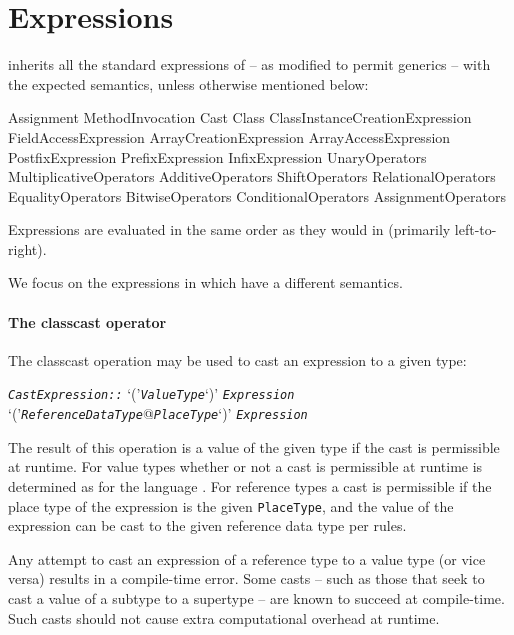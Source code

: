 \section{Expressions}\label{XtenExpressions}

{}\Xten{} inherits all the standard expressions of \Java{}
\cite[\S~15]{jls2} -- as modified to permit generics \cite{gjspec} --
with the expected semantics, unless otherwise mentioned below:

\begin{x10}
Assignment MethodInvocation 
Cast Class
ClassInstanceCreationExpression FieldAccessExpression   
ArrayCreationExpression ArrayAccessExpression
PostfixExpression PrefixExpression 
InfixExpression UnaryOperators
MultiplicativeOperators AdditiveOperators 
ShiftOperators RelationalOperators  
EqualityOperators BitwiseOperators
ConditionalOperators AssignmentOperators
\end{x10}

Expressions are evaluated in the same order as they would in \java{}
(primarily
left-to-right).\label{FieldAccess}\label{ClassCreation}\label{MethodInvocation}

We focus on the expressions in \Xten{} which have a different
semantics.

\paragraph{The classcast operator}\label{ClassCast}

The classcast operation may be used to cast an expression to a given type:

\begin{x10}
 {\em\tt{}CastExpression::}
   `('{\em\tt{}ValueType}`)' {\em\tt{}Expression}
   `('{\em\tt{}ReferenceDataType}@{\em\tt{}PlaceType}`)' {\em\tt{}Expression}
\end{x10}

The result of this operation is a value of the given type if the cast
is permissible at runtime. For value types whether or not a cast is
permissible at runtime is determined as for the \java{} language
{}\cite[\S 5.5]{jls2}. For reference types a cast is permissible if
the place type of the expression is the given {\tt PlaceType}, and the
value of the expression can be cast to the given reference data type
per \java{} rules.

Any attempt to cast an expression of a reference type to a value type
(or vice versa) results in a compile-time error. Some casts -- such as
those that seek to cast a value of a subtype to a supertype -- are
known to succeed at compile-time. Such casts should not cause extra
computational overhead at runtime.

